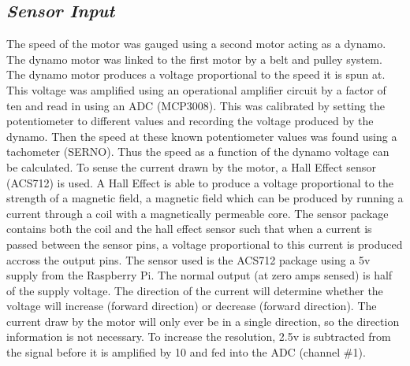 \documentclass[twoside,a4]{report}
\def\br{\newline \newline \noindent}
\begin{document}
	\subsection*{\textit{Sensor Input}} %
	The speed of the motor was gauged using a second motor acting as a dynamo. The dynamo motor was linked to the first motor by a belt and pulley system. The dynamo motor produces a voltage proportional to the speed it is spun at. This voltage was amplified using an operational amplifier circuit by a factor of ten and read in using an ADC (MCP3008). This was calibrated by setting the potentiometer to different values and recording the voltage produced by the dynamo. Then the speed at these known potentiometer values was found using a tachometer (SERNO). Thus the speed as a function of the dynamo voltage can be calculated. \br
	To sense the current drawn by the motor, a Hall Effect sensor (ACS712) is used. A Hall Effect is able to produce a voltage proportional to the strength of a magnetic field, a magnetic field which can be produced by running a current through a coil with a magnetically permeable core. The sensor package contains both the coil and the hall effect sensor such that when a current is passed between the sensor pins, a voltage proportional to this current is produced accross the output pins. The sensor used is the ACS712 package using a 5v supply from the Raspberry Pi. The normal output (at zero amps sensed) is half of the supply voltage. The direction of the current will determine whether the voltage will increase (forward direction) or decrease (forward direction). 
	\br
	The current draw by the motor will only ever be in a single direction, so the direction information is not necessary. To increase the resolution, 2.5v is subtracted from the signal before it is amplified by 10 and fed into the ADC (channel \#1). 
	
\end{document}
